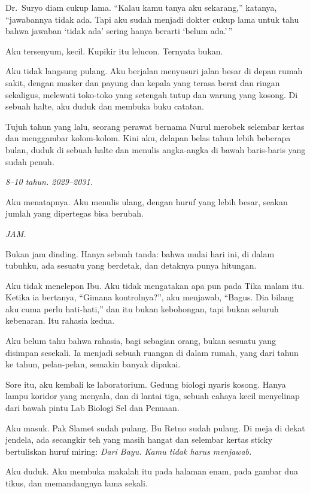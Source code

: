 \documentclass[11pt,twoside,openany]{book}
\makeatletter
\newcommand{\scenebreak}{\par\vspace{0.9em}{\centering\textsc{*\hspace{0.7em}*\hspace{0.7em}*}\par}\vspace{0.9em}\@afterindentfalse\@afterheading}
\makeatother
\begin{document}
Dr.~Suryo diam cukup lama. ``Kalau kamu tanya aku sekarang,'' katanya, ``jawabannya tidak ada. Tapi aku sudah menjadi dokter cukup lama untuk tahu bahwa jawaban `tidak ada' sering hanya berarti `belum ada.'\,''

Aku tersenyum, kecil. Kupikir itu lelucon. Ternyata bukan.

\scenebreak
Aku tidak langsung pulang. Aku berjalan menyusuri jalan besar di depan rumah sakit, dengan masker dan payung dan kepala yang terasa berat dan ringan sekaligus, melewati toko-toko yang setengah tutup dan warung yang kosong. Di sebuah halte, aku duduk dan membuka buku catatan.

Tujuh tahun yang lalu, seorang perawat bernama Nurul merobek selembar kertas dan menggambar kolom-kolom. Kini aku, delapan belas tahun lebih beberapa bulan, duduk di sebuah halte dan menulis angka-angka di bawah baris-baris yang sudah penuh.

\emph{8--10 tahun. 2029--2031.}

Aku menatapnya. Aku menulis ulang, dengan huruf yang lebih besar, seakan jumlah yang dipertegas bisa berubah.

\emph{JAM.}

Bukan jam dinding. Hanya sebuah tanda: bahwa mulai hari ini, di dalam tubuhku, ada sesuatu yang berdetak, dan detaknya punya hitungan.

Aku tidak menelepon Ibu. Aku tidak mengatakan apa pun pada Tika malam itu. Ketika ia bertanya, ``Gimana kontrolnya?'', aku menjawab, ``Bagus. Dia bilang aku cuma perlu hati-hati,'' dan itu bukan kebohongan, tapi bukan seluruh kebenaran. Itu rahasia kedua.

Aku belum tahu bahwa rahasia, bagi sebagian orang, bukan sesuatu yang disimpan sesekali. Ia menjadi sebuah ruangan di dalam rumah, yang dari tahun ke tahun, pelan-pelan, semakin banyak dipakai.

\scenebreak
Sore itu, aku kembali ke laboratorium. Gedung biologi nyaris kosong. Hanya lampu koridor yang menyala, dan di lantai tiga, sebuah cahaya kecil menyelinap dari bawah pintu Lab Biologi Sel dan Penuaan.

Aku masuk. Pak Slamet sudah pulang. Bu Retno sudah pulang. Di meja di dekat jendela, ada secangkir teh yang masih hangat dan selembar kertas sticky bertuliskan huruf miring: \emph{Dari Bayu. Kamu tidak harus menjawab.}

Aku duduk. Aku membuka makalah itu pada halaman enam, pada gambar dua tikus, dan memandangnya lama sekali.
\end{document}
